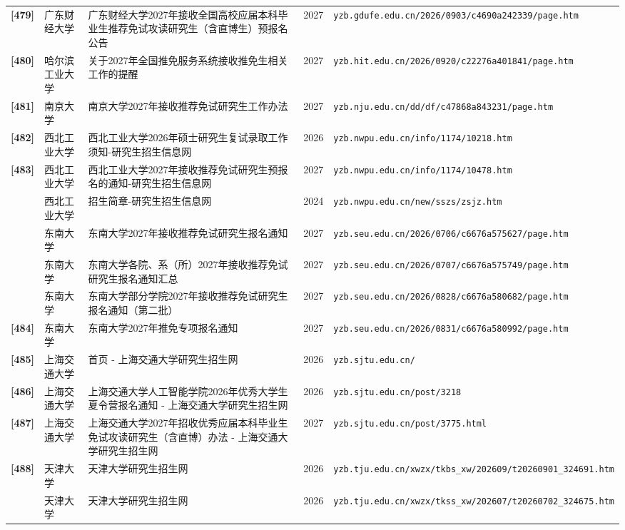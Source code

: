 {\begin{longtable}{@{}p{1.15cm}p{2.9cm}p{6.3cm}p{0.85cm}p{5.0cm}@{}}
\textbf{[479]} & 广东财经大学 & 广东财经大学2027年接收全国高校应届本科毕业生推荐免试攻读研究生（含直博生）预报名公告 & 2027 & \texttt{yzb.gdufe.edu.cn/2026/0903/c4690a242339/page.htm} \\
\textbf{[480]} & 哈尔滨工业大学 & 关于2027年全国推免服务系统接收推免生相关工作的提醒 & 2027 & \texttt{yzb.hit.edu.cn/2026/0920/c22276a401841/page.htm} \\
\textbf{[481]} & 南京大学 & 南京大学2027年接收推荐免试研究生工作办法 & 2027 & \texttt{yzb.nju.edu.cn/dd/df/c47868a843231/page.htm} \\
\textbf{[482]} & 西北工业大学 & 西北工业大学2026年硕士研究生复试录取工作须知-研究生招生信息网 & 2026 & \texttt{yzb.nwpu.edu.cn/info/1174/10218.htm} \\
\textbf{[483]} & 西北工业大学 & 西北工业大学2027年接收推荐免试研究生预报名的通知-研究生招生信息网 & 2027 & \texttt{yzb.nwpu.edu.cn/info/1174/10478.htm} \\
[0] & 西北工业大学 & 招生简章-研究生招生信息网 & 2024 & \texttt{yzb.nwpu.edu.cn/new/sszs/zsjz.htm} \\
[0] & 东南大学 & 东南大学2027年接收推荐免试研究生报名通知 & 2027 & \texttt{yzb.seu.edu.cn/2026/0706/c6676a575627/page.htm} \\
[0] & 东南大学 & 东南大学各院、系（所）2027年接收推荐免试研究生报名通知汇总 & 2027 & \texttt{yzb.seu.edu.cn/2026/0707/c6676a575749/page.htm} \\
[0] & 东南大学 & 东南大学部分学院2027年接收推荐免试研究生报名通知（第二批） & 2027 & \texttt{yzb.seu.edu.cn/2026/0828/c6676a580682/page.htm} \\
\textbf{[484]} & 东南大学 & 东南大学2027年推免专项报名通知 & 2027 & \texttt{yzb.seu.edu.cn/2026/0831/c6676a580992/page.htm} \\
\textbf{[485]} & 上海交通大学 & 首页 - 上海交通大学研究生招生网 & 2026 & \texttt{yzb.sjtu.edu.cn/} \\
\textbf{[486]} & 上海交通大学 & 上海交通大学人工智能学院2026年优秀大学生夏令营报名通知 - 上海交通大学研究生招生网 & 2026 & \texttt{yzb.sjtu.edu.cn/post/3218} \\
\textbf{[487]} & 上海交通大学 & 上海交通大学2027年招收优秀应届本科毕业生免试攻读研究生（含直博）办法 - 上海交通大学研究生招生网 & 2027 & \texttt{yzb.sjtu.edu.cn/post/3775.html} \\
\textbf{[488]} & 天津大学 & 天津大学研究生招生网 & 2026 & \texttt{yzb.tju.edu.cn/xwzx/tkbs\_xw/202609/t20260901\_324691.htm} \\
[0] & 天津大学 & 天津大学研究生招生网 & 2026 & \texttt{yzb.tju.edu.cn/xwzx/tkss\_xw/202607/t20260702\_324675.htm} \\

\end{longtable}}
